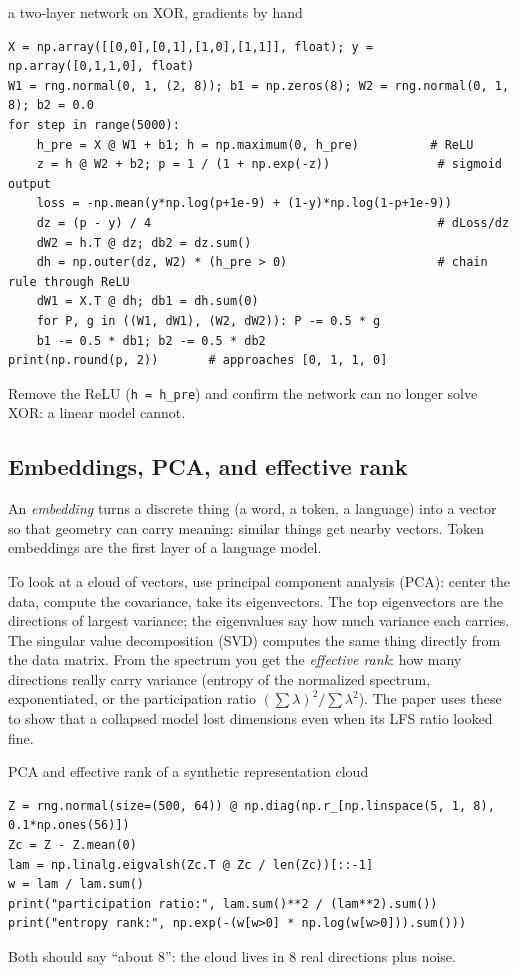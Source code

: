\begin{exercise}{a two-layer network on XOR, gradients by hand}
\begin{lstlisting}
X = np.array([[0,0],[0,1],[1,0],[1,1]], float); y = np.array([0,1,1,0], float)
W1 = rng.normal(0, 1, (2, 8)); b1 = np.zeros(8); W2 = rng.normal(0, 1, 8); b2 = 0.0
for step in range(5000):
    h_pre = X @ W1 + b1; h = np.maximum(0, h_pre)          # ReLU
    z = h @ W2 + b2; p = 1 / (1 + np.exp(-z))               # sigmoid output
    loss = -np.mean(y*np.log(p+1e-9) + (1-y)*np.log(1-p+1e-9))
    dz = (p - y) / 4                                        # dLoss/dz
    dW2 = h.T @ dz; db2 = dz.sum()
    dh = np.outer(dz, W2) * (h_pre > 0)                     # chain rule through ReLU
    dW1 = X.T @ dh; db1 = dh.sum(0)
    for P, g in ((W1, dW1), (W2, dW2)): P -= 0.5 * g
    b1 -= 0.5 * db1; b2 -= 0.5 * db2
print(np.round(p, 2))       # approaches [0, 1, 1, 0]
\end{lstlisting}
Remove the ReLU (\texttt{h = h\_pre}) and confirm the network can no longer
solve XOR: a linear model cannot.
\end{exercise}

\subsection{Embeddings, PCA, and effective rank}

An \emph{embedding} turns a discrete thing (a word, a token, a language) into
a vector so that geometry can carry meaning: similar things get nearby
vectors. Token embeddings are the first layer of a language model.

To look at a cloud of vectors, use principal component analysis (PCA): center
the data, compute the covariance, take its eigenvectors. The top eigenvectors
are the directions of largest variance; the eigenvalues say how much variance
each carries. The singular value decomposition (SVD) computes the same thing
directly from the data matrix. From the spectrum you get the \emph{effective
rank}: how many directions really carry variance (entropy of the normalized
spectrum, exponentiated, or the participation ratio $(\sum\lambda)^2/\sum\lambda^2$).
The paper uses these to show that a collapsed model lost dimensions even when
its LFS ratio looked fine.

\begin{exercise}{PCA and effective rank of a synthetic representation cloud}
\begin{lstlisting}
Z = rng.normal(size=(500, 64)) @ np.diag(np.r_[np.linspace(5, 1, 8), 0.1*np.ones(56)])
Zc = Z - Z.mean(0)
lam = np.linalg.eigvalsh(Zc.T @ Zc / len(Zc))[::-1]
w = lam / lam.sum()
print("participation ratio:", lam.sum()**2 / (lam**2).sum())
print("entropy rank:", np.exp(-(w[w>0] * np.log(w[w>0])).sum()))
\end{lstlisting}
Both should say ``about 8'': the cloud lives in 8 real directions plus noise.
\end{exercise}

